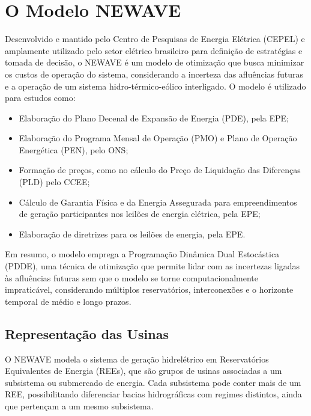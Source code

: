 \begin{figure}[!ht]
	{}
	{}
\end{figure}

\section{O Modelo NEWAVE}
\label{sec:newave}

Desenvolvido e mantido pelo Centro de Pesquisas de Energia Elétrica (CEPEL) e amplamente utilizado pelo setor elétrico 
brasileiro para definição de estratégias e tomada de decisão, o NEWAVE é um modelo de otimização que busca minimizar os 
custos de operação do sistema, considerando a incerteza das afluências futuras e a operação de um sistema 
hidro-térmico-eólico interligado. O modelo é utilizado para estudos como:
\begin{itemize}
	\item Elaboração do Plano Decenal de Expansão de Energia (PDE), pela EPE;
	\item Elaboração do Programa Mensal de Operação (PMO) e Plano de Operação Energética (PEN), pelo ONS;
	\item Formação de preços, como no cálculo do Preço de Liquidação das Diferenças (PLD) pelo CCEE;
	\item Cálculo de Garantia Física e da Energia Assegurada para empreendimentos de geração participantes nos leilões 
    de energia elétrica, pela EPE;
	\item Elaboração de diretrizes para os leilões de energia, pela EPE.
\end{itemize}

Em resumo, o modelo emprega a Programação Dinâmica Dual Estocástica (PDDE), uma técnica de otimização que permite lidar 
com as incertezas ligadas às afluências futuras sem que o modelo se torne computacionalmente impraticável, considerando 
múltiplos reservatórios, interconexões e o horizonte temporal de médio e longo prazos.

\subsection{Representação das Usinas}
O NEWAVE modela o sistema de geração hidrelétrico em Reservatórios Equivalentes de Energia (REEs), que são grupos de
usinas associadas a um subsistema ou submercado de energia. Cada subsistema pode conter mais de um REE, possibilitando
diferenciar bacias hidrográficas com regimes distintos, ainda que pertençam a um mesmo subsistema. 

